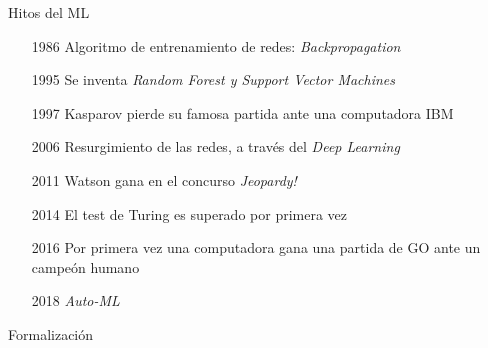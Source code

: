\documentclass[11pt]{beamer}
\begin{document}
\begin{frame}{Hitos del ML}
\begin{itemize}
    \item[1986] Algoritmo de entrenamiento de redes: \textit{Backpropagation}
    \item[1995] Se inventa \textit{Random Forest y Support Vector Machines}
    \item[1997] Kasparov pierde su famosa partida ante una computadora IBM
    \item[2006] Resurgimiento de las redes, a trav\'es del \textit{Deep Learning}
    \item[2011] Watson gana en el concurso \textit{Jeopardy!}
    \item[2014] El test de Turing es superado por primera vez
    \item[2016] Por primera vez una computadora gana una partida de GO ante un campe\'on humano
    \item[2018] \textit{Auto-ML}
\end{itemize}
\end{frame}
\begin{frame}{Formalizaci\'on}
    
\end{frame}
\end{document}
